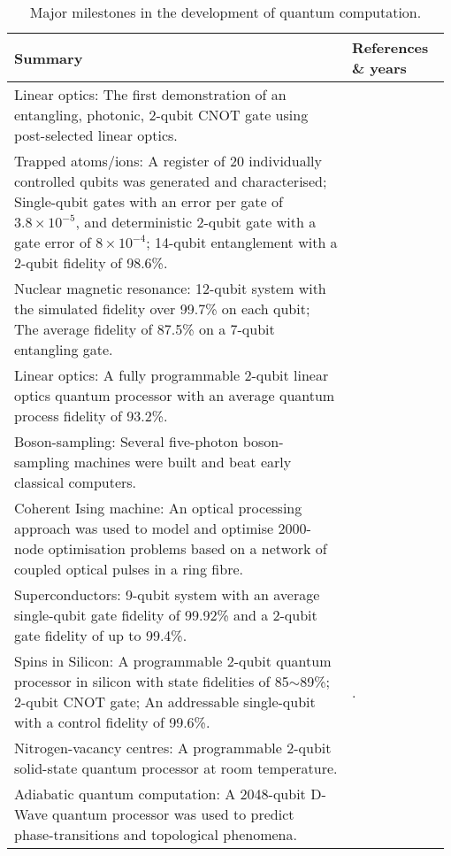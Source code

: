 \begin{table*}[!htbp]
	\begin{tabular}{|p{0.755\linewidth}|p{0.22\linewidth}|}
		\hline
			\textbf{Summary} & \textbf{References \& years} \\	
			\hline \hline
		Linear optics: The first demonstration of an entangling, photonic, 2-qubit CNOT gate using post-selected linear optics. & \cite{bib:OBrien03}\\
		\hline
		Trapped atoms/ions: A register of 20 individually controlled qubits was generated and characterised; Single-qubit gates with an error per gate of $3.8 \times {10^{ - 5}}$, and deterministic 2-qubit gate with a gate error of $8 \times {10^{ - 4}}$; 14-qubit entanglement with a 2-qubit fidelity of 98.6\%. & \cite{bib:friis2018observation, bib:Gaebler2016, bib:monz2011} \\
		\hline
		Nuclear magnetic resonance: 12-qubit system with the simulated fidelity over 99.7\% on each qubit; The average fidelity of 87.5\% on a 7-qubit entangling gate. & \cite{bib:Negrevergne2006, bib:lu2017enhancing, bib:Lu2015} \\
		\hline
		Linear optics: A fully programmable 2-qubit linear optics quantum processor with an average quantum process fidelity of 93.2\%. & \cite{bib:qiang2018large} \\
		\hline
		Boson-sampling: Several five-photon boson-sampling machines were built and beat early classical computers. & \cite{bib:zhong201812, bib:wang2018toward, bib:wang2017high} \\
		\hline
		Coherent Ising machine: An optical processing approach was used to model and optimise 2000-node optimisation problems based on a network of coupled optical pulses in a ring fibre. & \cite{bib:mcmahon2016fully, bib:inagaki2016coherent} \\
		\hline
		Superconductors: 9-qubit system with an average single-qubit gate fidelity of 99.92\% and a 2-qubit gate fidelity of up to 99.4\%. & \cite{bib:kelly2015state, bib:barends2014superconducting} \\
		\hline
		Spins in Silicon: A programmable 2-qubit quantum processor in silicon with state fidelities of 85$\sim$89\%; 2-qubit CNOT gate; An addressable single-qubit with a control fidelity of 99.6\%. & \cite{bib:watson2018programmable, bib:veldhorst2015two, bib:veldhorst2014addressable}. \\
		\hline
		Nitrogen-vacancy centres: A programmable 2-qubit solid-state quantum processor at room temperature. & \cite{bib:wu2018programmable} \\
		\hline
		Adiabatic quantum computation: A 2048-qubit D-Wave quantum processor was used to predict phase-transitions and topological phenomena. & \cite{bib:harris2018phase, bib:king2018observation} \\
		\hline
	\end{tabular}
	\captionspacetab \caption{Major milestones in the development of quantum computation.} \label{tab:quantumcomputer}
\end{table*}

\startalgtable